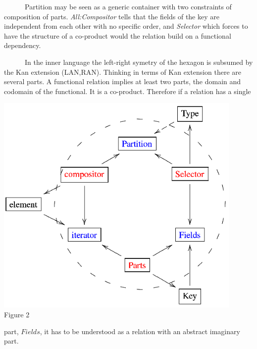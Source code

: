 \noindent
\begin{minipage}[h]{7.0cm}
~~~~~~Partition may be seen as a generic container with two constraints of composition of parts. {\it All:Compositor} tells that the fields of the key are independent from each other with no specific order, and {\it Selector} which forces to have the structure of a co-product would the relation build on a functional dependency.

~~~~~~In the inner language the left-right symetry of the hexagon is subsumed by the Kan extension (LAN,RAN). Thinking in terms of Kan extension there are several parts. A functional relation implies at least two parts, the domain and codomain of the functional. It is a co-product. Therefore if a relation has a single
\end{minipage}
\begin{minipage}[h]{7.0cm}
 \begin{center}

  \includegraphics[width=0.9\textwidth]{part8/Viallefond_P52/P52_2.eps}
  \\Figure 2

 \end{center}
\end{minipage}
\hfill
 part, $Fields$, it has to be understood as a relation with an abstract imaginary part.

